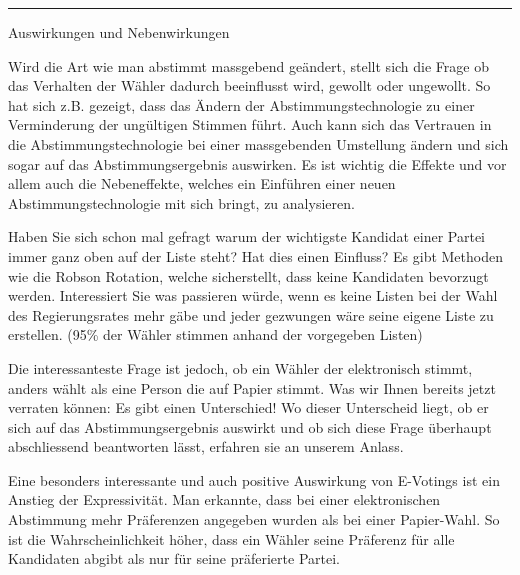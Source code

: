 \documentclass[10pt,a4paper]{article} %
\newcommand{\SepRule}{\noindent	%
\begin{center}
\rule{250pt}{1pt} %
\end{center}
}
\newcommand{\NewsItem}[1]{ %
\usefont{T1}{fvs}{n}{n} %
\vspace{24pt}\large #1\vspace{3pt} %
\par \normalsize \normalfont}
\newcommand{\NewsAuthor}[1]{ %
\hfill by \textsc{#1} \vspace{20pt} %
\par \normalfont}
\begin{document}
\vspace{0.5cm}
\SepRule %
\vspace{0.5cm}

\begin{multicols}{3} %


\begin{flushleft}
\NewsItem{Auswirkungen und Nebenwirkungen}
\end{flushleft}

Wird die Art wie man abstimmt massgebend geändert, stellt sich die Frage ob das Verhalten der Wähler dadurch beeinflusst wird, gewollt oder ungewollt. So hat sich z.B. gezeigt, dass das Ändern der Abstimmungstechnologie zu einer Verminderung der ungültigen Stimmen führt. Auch kann sich das Vertrauen in die Abstimmungstechnologie bei einer massgebenden Umstellung ändern und sich sogar auf das Abstimmungsergebnis auswirken.
Es ist wichtig die Effekte und vor allem auch die Nebeneffekte, welches ein Einführen einer neuen Abstimmungstechnologie mit sich bringt, zu analysieren.

Haben Sie sich schon mal gefragt warum der wichtigste Kandidat einer Partei immer ganz oben auf der Liste steht? Hat dies einen Einfluss? Es gibt Methoden wie die Robson Rotation, welche sicherstellt, dass keine Kandidaten bevorzugt werden.
Interessiert Sie was passieren würde, wenn es keine Listen bei der Wahl des Regierungsrates mehr gäbe und jeder gezwungen wäre seine eigene Liste zu erstellen. (95\% der Wähler stimmen anhand der vorgegeben Listen)

Die interessanteste Frage ist jedoch, ob ein Wähler der elektronisch stimmt, anders wählt als eine Person die auf Papier stimmt. Was wir Ihnen bereits jetzt verraten können: Es gibt einen Unterschied! Wo dieser Unterscheid liegt, ob er sich auf das Abstimmungsergebnis auswirkt und ob sich diese Frage überhaupt abschliessend beantworten lässt, erfahren sie an unserem Anlass.

Eine besonders interessante und auch positive Auswirkung von E-Votings ist ein Anstieg der Expressivität. Man erkannte, dass bei einer elektronischen Abstimmung mehr Präferenzen angegeben wurden als bei einer Papier-Wahl. So ist die Wahrscheinlichkeit höher, dass ein Wähler seine Präferenz für alle Kandidaten abgibt als nur für seine präferierte Partei.



\end{multicols}
\end{document}
